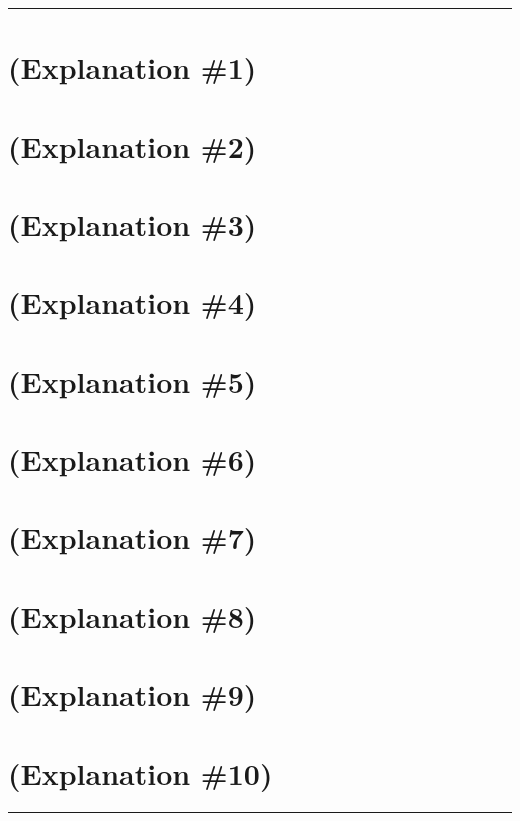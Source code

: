 \documentclass[draft]{report}
\newenvironment{expl}[0]%
  {\rule{\textwidth}{.2pt}\footnotesize}%
  {\rule{\textwidth}{.2pt}\normalsize}
\begin{document}
\begin{expl}
\section{(Explanation \#1)}\label{explanation-1-1}


\section{(Explanation \#2)}\label{explanation-2-1}


\section{(Explanation \#3)}\label{explanation-3-1}


\section{(Explanation \#4)}\label{explanation-4}


\section{(Explanation \#5)}\label{explanation-5}


\section{(Explanation \#6)}\label{explanation-6}


\section{(Explanation \#7)}\label{explanation-7}


\section{(Explanation \#8)}\label{explanation-8}


\section{(Explanation \#9)}\label{explanation-9}


\section{(Explanation \#10)}\label{explanation-10}

\end{expl}
\end{document}
